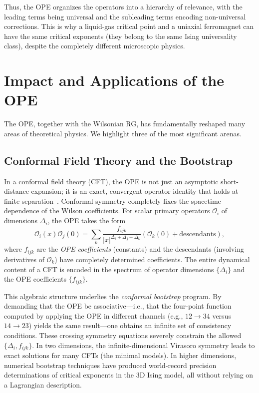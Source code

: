 \documentclass[11pt]{article}
\begin{document}
Thus, the OPE organizes the operators into a hierarchy of relevance, with the leading terms being universal and the subleading terms encoding non-universal corrections. This is why a liquid-gas critical point and a uniaxial ferromagnet can have the same critical exponents (they belong to the same Ising universality class), despite the completely different microscopic physics.

\section{Impact and Applications of the OPE}
\label{sec:applications}

The OPE, together with the Wilsonian RG, has fundamentally reshaped many areas of theoretical physics. We highlight three of the most significant arenas.

\subsection{Conformal Field Theory and the Bootstrap}
\label{sec:CFT}
In a conformal field theory (CFT), the OPE is not just an asymptotic short-distance expansion; it is an exact, convergent operator identity that holds at finite separation~\cite{Belavin:1984vu}. Conformal symmetry completely fixes the spacetime dependence of the Wilson coefficients. For scalar primary operators $\mathcal{O}_i$ of dimensions $\Delta_i$, the OPE takes the form
\begin{equation}
\mathcal{O}_i(x) \mathcal{O}_j(0) = \sum_k \frac{f_{ijk}}{|x|^{\Delta_i + \Delta_j - \Delta_k}} \left( \mathcal{O}_k(0) + \text{descendants} \right),
\end{equation}
where $f_{ijk}$ are the \emph{OPE coefficients} (constants) and the descendants (involving derivatives of $\mathcal{O}_k$) have completely determined coefficients. The entire dynamical content of a CFT is encoded in the spectrum of operator dimensions $\{\Delta_i\}$ and the OPE coefficients $\{f_{ijk}\}$.

This algebraic structure underlies the \emph{conformal bootstrap} program. By demanding that the OPE be associative---i.e., that the four-point function computed by applying the OPE in different channels (e.g., $12 \to 34$ versus $14 \to 23$) yields the same result---one obtains an infinite set of consistency conditions. These crossing symmetry equations severely constrain the allowed $\{\Delta_i, f_{ijk}\}$. In two dimensions, the infinite-dimensional Virasoro symmetry leads to exact solutions for many CFTs (the minimal models). In higher dimensions, numerical bootstrap techniques have produced world-record precision determinations of critical exponents in the 3D Ising model, all without relying on a Lagrangian description.
\end{document}
